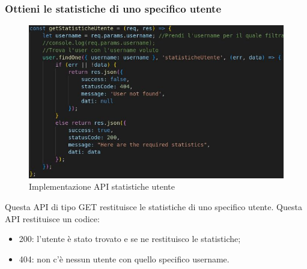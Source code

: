 \subsubsection{Ottieni le statistiche di uno specifico utente}
\begin{figure}[!h]
\centering
\includegraphics[scale=0.4]{images/api_statistiche_utente.jpg}
\caption{Implementazione API statistiche utente}
\label{fig:api_statistiche_utente}
\end{figure}
\noindent
Questa API di tipo GET restituisce le statistiche di uno specifico utente.
Questa API restituisce un codice:
\begin{itemize}
    \item 200: l'utente è stato trovato e se ne restituisco le statistiche;
    \item 404: non c'è nessun utente con quello specifico username.
\end{itemize}

\newpage
